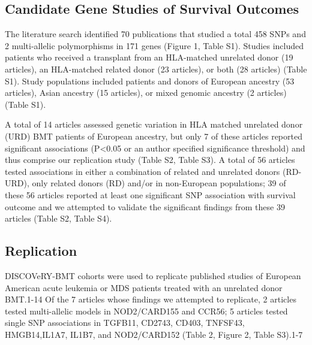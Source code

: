 \documentclass[]{DissertateUSU}
\begin{document}
\subsection{Candidate Gene Studies of Survival
Outcomes}\label{candidate-gene-studies-of-survival-outcomes}

The literature search identified 70 publications that studied a total
458 SNPs and 2 multi-allelic polymorphisms in 171 genes (Figure 1, Table
S1). Studies included patients who received a transplant from an
HLA-matched unrelated donor (19 articles), an HLA-matched related donor
(23 articles), or both (28 articles) (Table S1). Study populations
included patients and donors of European ancestry (53 articles), Asian
ancestry (15 articles), or mixed genomic ancestry (2 articles) (Table
S1).

A total of 14 articles assessed genetic variation in HLA matched
unrelated donor (URD) BMT patients of European ancestry, but only 7 of
these articles reported significant associations (P\textless{}0.05 or an
author specified significance threshold) and thus comprise our
replication study (Table S2, Table S3). A total of 56 articles tested
associations in either a combination of related and unrelated donors
(RD-URD), only related donors (RD) and/or in non-European populations;
39 of these 56 articles reported at least one significant SNP
association with survival outcome and we attempted to validate the
significant findings from these 39 articles (Table S2, Table S4).

\subsection{Replication}\label{replication}

DISCOVeRY-BMT cohorts were used to replicate published studies of
European American acute leukemia or MDS patients treated with an
unrelated donor BMT.1-14 Of the 7 articles whose findings we attempted
to replicate, 2 articles tested multi-allelic models in NOD2/CARD155 and
CCR56; 5 articles tested single SNP associations in TGFB11, CD2743,
CD403, TNFSF43, HMGB14,IL1A7, IL1B7, and NOD2/CARD152 (Table 2, Figure
2, Table S3).1-7
\end{document}
